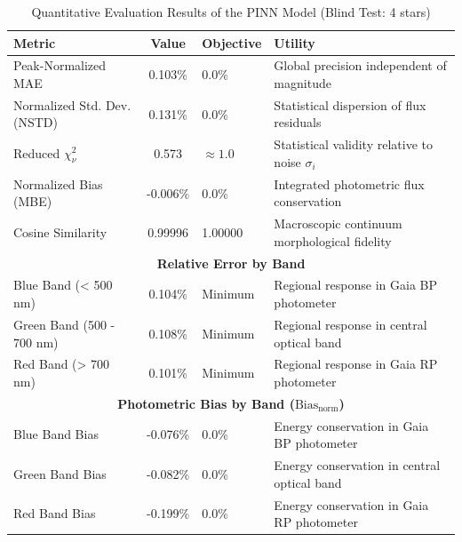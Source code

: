 
\begin{table}[htpb]
\centering
\caption{Quantitative Evaluation Results of the PINN Model (Blind Test: 4 stars)}
\label{tab:pinn_evaluation}
\begin{tabular}{lcll}
\hline
\textbf{Metric} & \textbf{Value} & \textbf{Objective} & \textbf{Utility} \\
\hline
Peak-Normalized MAE & 0.103\% & 0.0\% & Global precision independent of magnitude \\
Normalized Std. Dev. (NSTD) & 0.131\% & 0.0\% & Statistical dispersion of flux residuals \\
Reduced $\chi^2_\nu$ & 0.573 & $\approx 1.0$ & Statistical validity relative to noise $\sigma_i$ \\
Normalized Bias (MBE) & -0.006\% & 0.0\% & Integrated photometric flux conservation \\
Cosine Similarity & 0.99996 & 1.00000 & Macroscopic continuum morphological fidelity \\
\hline
\multicolumn{4}{c}{\textbf{Relative Error by Band}} \\
\hline
Blue Band (< 500 nm) & 0.104\% & Minimum & Regional response in Gaia BP photometer \\
Green Band (500 - 700 nm) & 0.108\% & Minimum & Regional response in central optical band \\
Red Band (> 700 nm) & 0.101\% & Minimum & Regional response in Gaia RP photometer \\
\hline
\multicolumn{4}{c}{\textbf{Photometric Bias by Band ($\text{Bias}_{\text{norm}}$)}} \\
\hline
Blue Band Bias & -0.076\% & 0.0\% & Energy conservation in Gaia BP photometer \\
Green Band Bias & -0.082\% & 0.0\% & Energy conservation in central optical band \\
Red Band Bias & -0.199\% & 0.0\% & Energy conservation in Gaia RP photometer \\
\hline
\end{tabular}
\end{table}
